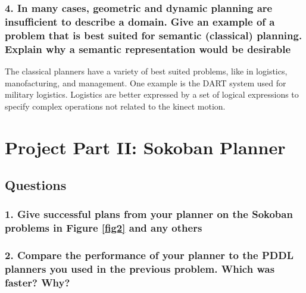 \documentclass[10pt, letter]{article}
\begin{document}
\subsubsection*{4. In many cases, geometric and dynamic planning are insufficient to describe a domain. Give
an example of a problem that is best suited for semantic (classical) planning. Explain why a
semantic representation would be desirable}

The classical planners have a variety of best suited problems, like in logistics, manofacturing, and management. One example is the DART system used for military logistics. Logistics are better expressed by a set of logical expressions to specify complex operations not related to the kinect motion.


\section{Project Part II: Sokoban Planner}
\subsection{Questions}
\subsubsection*{1. Give successful plans from your planner on the Sokoban problems in Figure \ref{fig2} and any others}
\subsubsection*{2. Compare the performance of your planner to the PDDL planners you used in the previous
problem. Which was faster? Why?}
\end{document}
